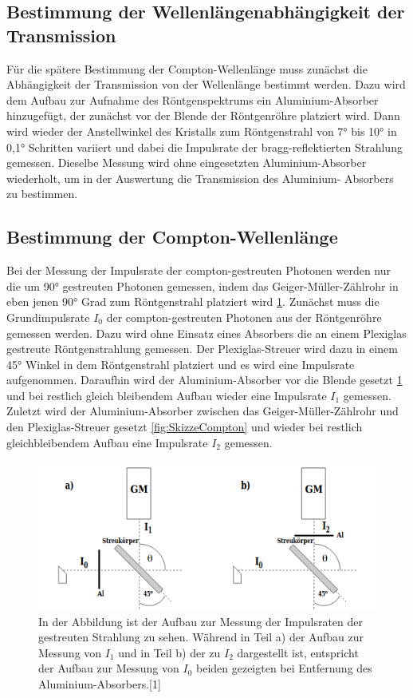 \documentclass[titlepage = firstcover]{scrartcl}
\begin{document}
        \subsection{Bestimmung der Wellenlängenabhängigkeit der Transmission}
        Für die spätere Bestimmung der Compton-Wellenlänge muss zunächst die Abhängigkeit der Transmission von der Wellenlänge bestimmt werden. Dazu wird dem
        Aufbau zur Aufnahme des Röntgenspektrums ein Aluminium-Absorber hinzugefügt, der zunächst vor der Blende der Röntgenröhre platziert wird. Dann wird 
        wieder der Anstellwinkel des Kristalls zum Röntgenstrahl von 7° bis 10° in 0,1° Schritten variiert und dabei die Impulsrate der bragg-reflektierten
        Strahlung gemessen. Dieselbe Messung wird ohne eingesetzten Aluminium-Absorber wiederholt, um in der Auswertung die Transmission des Aluminium-
        Absorbers zu bestimmen.

        \subsection{Bestimmung der Compton-Wellenlänge}
        Bei der Messung der Impulsrate der compton-gestreuten Photonen werden nur die um 90° gestreuten Photonen gemessen, indem das Geiger-Müller-Zählrohr
        in eben jenen 90° Grad zum Röntgenstrahl platziert wird \ref{fig:SkizzeAbsorber}. 
        Zunächst muss die Grundimpulsrate $I_0$ der compton-gestreuten Photonen aus der Röntgenröhre gemessen werden. Dazu wird ohne Einsatz eines Absorbers
        die an einem Plexiglas gestreute Röntgenstrahlung gemessen. Der Plexiglas-Streuer wird dazu in einem 45° Winkel in dem Röntgenstrahl platziert und es 
        wird eine Impulsrate aufgenommen. Daraufhin wird der Aluminium-Absorber vor die Blende gesetzt \ref{fig:SkizzeAbsorber} und bei restlich gleich bleibendem Aufbau wieder
        eine Impulsrate $I_1$ gemessen. Zuletzt wird der Aluminium-Absorber zwischen das Geiger-Müller-Zählrohr und den Plexiglas-Streuer gesetzt  
        \ref{fig:SkizzeCompton} und wieder bei restlich gleichbleibendem Aufbau eine Impulsrate $I_2$ gemessen.

        \FloatBarrier
        \begin{figure}[h]
            \centering
            \includegraphics[width = 0.8\linewidth]{absorber.png}
            \caption{In der Abbildung ist der Aufbau zur Messung der Impulsraten der gestreuten Strahlung zu sehen. Während in Teil a) der Aufbau zur Messung von $I_1$ und in Teil b) der zu $I_2$ dargestellt ist, entspricht der Aufbau zur Messung von $I_0$ beiden gezeigten bei Entfernung des Aluminium-Absorbers.[1]}
            \label{fig:SkizzeAbsorber}
        \end{figure} 
        \FloatBarrier
        \newpage
\end{document}

